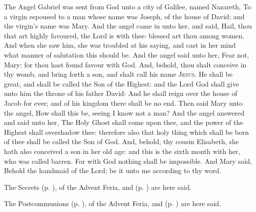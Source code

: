  The Angel Gabriel was sent from God unto a city of Galilee, named Nazareth, To a virgin espoused to a man whose name was Joseph, of the house of David; and the virgin's name was Mary. And the angel came in unto her, and said, Hail, thou that art highly favoured, the Lord is with thee: blessed art thou among women. And when she saw him, she was troubled at his saying, and cast in her mind what manner of salutation this should be. And the angel said unto her, Fear not, Mary: for thou hast found favour with God. And, behold, thou shalt conceive in thy womb, and bring forth a son, and shalt call his name {\textsc{Jesus}}. He shall be great, and shall be called the Son of the Highest: and the Lord God shall give unto him the throne of his father David: And he shall reign over the house of Jacob for ever; and of his kingdom there shall be no end. Then said Mary unto the angel, How shall this be, seeing I know not a man? And the angel answered and said unto her, The Holy Ghost shall come upon thee, and the power of the Highest shall overshadow thee: therefore also that holy thing which shall be born of thee shall be called the Son of God. And, behold, thy cousin Elisabeth, she hath also conceived a son in her old age: and this is the sixth month with her, who was called barren. For with God nothing shall be impossible. And Mary said, Behold the handmaid of the Lord; be it unto me according to thy word.
\begin{rubric}
    The Secrets  (p. \pageref{SPMaryInAdvent}), of the Advent Feria, and  (p. \pageref{SPHolyGhost}) are here said.
\end{rubric}

\begin{rubric}
    The Postcommunions  (p. \pageref{SPMaryInAdvent}), of the Advent Feria, and  (p. \pageref{SPHolyGhost}) are here said.
\end{rubric}

